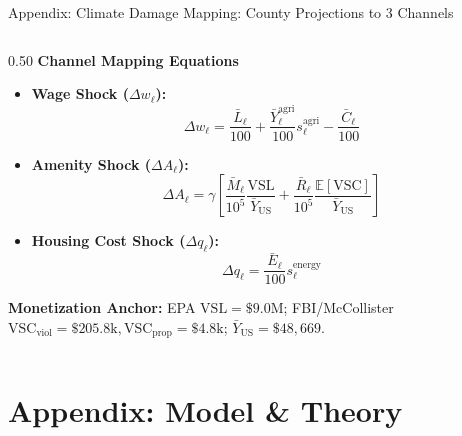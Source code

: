 \documentclass[aspectratio=169, 10pt]{beamer}
\begin{document}
\begin{frame}{Appendix: Climate Damage Mapping: County Projections to 3 Channels \hfill \hyperlink{main:damage_mapping}{\scriptsize{}}}
\begin{columns}[T]
        \begin{column}{0.50\textwidth}
            \textbf{\small Channel Mapping Equations}
            \vspace{0.04cm}
            \begin{itemize}\scriptsize\setlength{\itemsep}{2.5pt}
                \item \textbf{Wage Shock ($\Delta w_\ell$):}
                $$\Delta w_\ell = \frac{\bar{L}_\ell}{100} + \frac{\bar{Y}_\ell^{\text{agri}}}{100} s_\ell^{\text{agri}} - \frac{\bar{C}_\ell}{100}$$
                \item \textbf{Amenity Shock ($\Delta A_\ell$):}
                $$\Delta A_\ell = \gamma \left[ \frac{\bar{M}_\ell}{10^5} \frac{\text{VSL}}{\bar{Y}_{\text{US}}} + \frac{\bar{R}_\ell}{10^5} \frac{\mathbb{E}[\text{VSC}]}{\bar{Y}_{\text{US}}} \right]$$
                \item \textbf{Housing Cost Shock ($\Delta q_\ell$):}
                $$\Delta q_\ell = \frac{\bar{E}_\ell}{100} s_\ell^{\text{energy}}$$
            \end{itemize}
            \vspace{0.02cm}
            \begin{tcolorbox}[leafbox]
                \tiny \textbf{Monetization Anchor:} EPA $\text{VSL} = \$9.0\text{M}$; FBI/McCollister $\text{VSC}_{\text{viol}} = \$205.8\text{k}, \text{VSC}_{\text{prop}} = \$4.8\text{k}$; $\bar{Y}_{\text{US}} = \$48,669$.
            \end{tcolorbox}
        \end{column}
    \end{columns}
\end{frame}

\section{Appendix: Model \& Theory}
\end{document}
